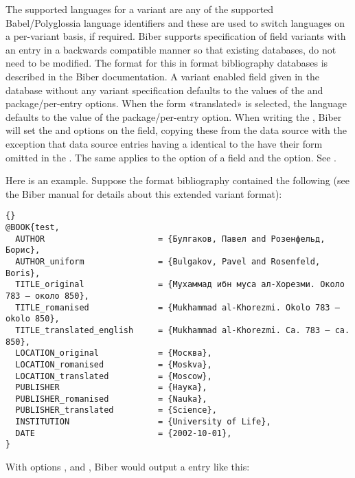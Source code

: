 \documentclass{ltxdockit}[2011/03/25]
\newcommand*{\biber}{Biber\xspace}
\begin{document}
The supported languages for a variant are any of the supported Babel/Polyglossia language identifiers and these are used to switch languages on a per-variant basis, if required. \biber supports specification of field variants with an entry in a backwards compatible manner so that existing  databases, do not need to be modified. The format for this in \bibtex format bibliography databases is described in the \biber documentation. A variant enabled field given in the database without any variant specification defaults to the values of the  and  package/per-entry options. When the form «translated» is selected, the language defaults to the value of the  package/per-entry option. When writing the , \biber will set the  and  options on the field, copying these from the data source with the exception that data source entries having a  identical to the  have their form omitted in the . The same applies to the  option of a field and the  option. See .

Here is an example. Suppose the \bibtex format bibliography contained the following (see the \biber manual for details about this extended variant format):

\begin{lstlisting}[style=bibtex]{}
@BOOK{test,
  AUTHOR                       = {Булгаков, Павел and Розенфельд, Борис},
  AUTHOR_uniform               = {Bulgakov, Pavel and Rosenfeld, Boris},
  TITLE_original               = {Мухаммад ибн муса ал-Хорезми. Около 783 – около 850},
  TITLE_romanised              = {Mukhammad al-Khorezmi. Okolo 783 – okolo 850},
  TITLE_translated_english     = {Mukhammad al-Khorezmi. Ca. 783 – ca. 850},
  LOCATION_original            = {Москва},
  LOCATION_romanised           = {Moskva},
  LOCATION_translated          = {Moscow},
  PUBLISHER                    = {Наука},
  PUBLISHER_romanised          = {Nauka},
  PUBLISHER_translated         = {Science},
  INSTITUTION                  = {University of Life},
  DATE                         = {2002-10-01},
}
\end{lstlisting}
%
With options ,  and , \biber would output a  entry like this:
\end{document}
